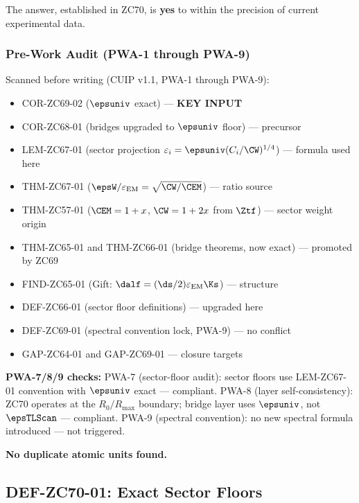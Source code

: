 \documentclass[12pt, a4paper]{article}
\renewcommand{\epsEM}{\varepsilon_{\rm EM}}
\begin{document}
The answer, established in ZC70, is \textbf{yes} to within
the precision of current experimental data.

\subsubsection{Pre-Work Audit (PWA-1 through PWA-9)}

\begin{formalbox}[title={Pre-Work Audit Record --- ZC70}]
Scanned before writing (CUIP v1.1, PWA-1 through PWA-9):
\begin{itemize}[leftmargin=2em, noitemsep]
  \item COR-ZC69-02 ($\epsuniv$ exact) --- \textbf{KEY INPUT}
  \item COR-ZC68-01 (bridges upgraded to $\epsuniv$ floor) --- precursor
  \item LEM-ZC67-01 (sector projection $\varepsilon_i =
    \epsuniv(C_i/\CW)^{1/4}$) --- formula used here
  \item THM-ZC67-01 ($\epsW/\epsEM = \sqrt{\CW/\CEM}$) --- ratio source
  \item THM-ZC57-01 ($\CEM = 1+x$, $\CW = 1+2x$ from $\Ztf$) ---
    sector weight origin
  \item THM-ZC65-01 and THM-ZC66-01 (bridge theorems, now exact) ---
    promoted by ZC69
  \item FIND-ZC65-01 (Gift: $\dalf = (\ds/2)\epsEM\Ks$) --- structure
  \item DEF-ZC66-01 (sector floor definitions) --- upgraded here
  \item DEF-ZC69-01 (spectral convention lock, PWA-9) --- no conflict
  \item GAP-ZC64-01 and GAP-ZC69-01 --- closure targets
\end{itemize}

\textbf{PWA-7/8/9 checks:}
PWA-7 (sector-floor audit): sector floors use
LEM-ZC67-01 convention with $\epsuniv$ exact --- compliant.
PWA-8 (layer self-consistency): ZC70 operates at the
$R_0/R_{\max}$ boundary; bridge layer uses $\epsuniv$,
not $\epsTLScan$ --- compliant.
PWA-9 (spectral convention): no new spectral formula
introduced --- not triggered.

\textbf{No duplicate atomic units found.}
\end{formalbox}

\newpage

\subsection{DEF-ZC70-01: Exact Sector Floors}
\label{sec:def01}
\end{document}
